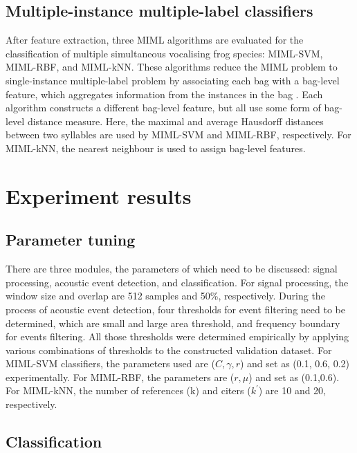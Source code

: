 \subsection{Multiple-instance multiple-label classifiers}
After feature extraction, three MIML algorithms are evaluated for the classification of multiple simultaneous vocalising frog species: MIML-SVM, MIML-RBF, and MIML-kNN. 
These algorithms reduce the MIML problem to single-instance multiple-label problem by associating each bag with a bag-level feature, which aggregates information from the instances in the bag  \citep{briggs2012acoustic}. Each algorithm constructs a different bag-level feature, but all use some form of bag-level distance measure. Here, the maximal and average Hausdorff distances between two syllables are used by MIML-SVM and MIML-RBF, respectively. For MIML-kNN, the nearest neighbour is used to assign bag-level features. 


\section{Experiment results}

\subsection{Parameter tuning}
There are three modules, the parameters of which need to be discussed: signal processing, acoustic event detection, and classification. For signal processing, the window size and overlap are 512 samples and 50\%, respectively. During the process of acoustic event detection, four thresholds for event filtering need to be determined, which are small and large area threshold, and frequency boundary for events filtering. All those thresholds were determined empirically by applying various combinations of thresholds to the constructed validation dataset. For MIML-SVM classifiers, the parameters used are ($C,\gamma,r$) and set as (0.1, 0.6, 0.2) experimentally. For MIML-RBF, the parameters are ($ r, \mu$) and set as (0.1,0.6). For MIML-kNN, the number of references (k) and citers ($k^{'}$) are 10 and 20, respectively.
 


\subsection{Classification}

